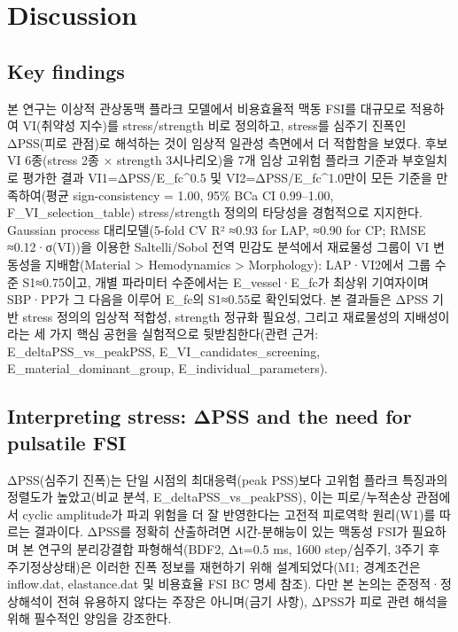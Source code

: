 \documentclass[preprint,12pt]{elsarticle}
\begin{document}
\section{Discussion}

\subsection{Key findings}
본 연구는 이상적 관상동맥 플라크 모델에서 비용효율적 맥동 FSI를 대규모로 적용하여 VI(취약성 지수)를 stress/strength 비로 정의하고, stress를 심주기 진폭인 ΔPSS(피로 관점)로 해석하는 것이 임상적 일관성 측면에서 더 적합함을 보였다. 후보 VI 6종(stress 2종 × strength 3시나리오)을 7개 임상 고위험 플라크 기준과 부호일치로 평가한 결과 VI1=ΔPSS/E\_fc\textasciicircum 0.5 및 VI2=ΔPSS/E\_fc\textasciicircum 1.0만이 모든 기준을 만족하여(평균 sign-consistency = 1.00, 95\% BCa CI 0.99–1.00, F\_VI\_selection\_table) stress/strength 정의의 타당성을 경험적으로 지지한다. Gaussian process 대리모델(5-fold CV R² ≈0.93 for LAP, ≈0.90 for CP; RMSE ≈0.12·σ(VI))을 이용한 Saltelli/Sobol 전역 민감도 분석에서 재료물성 그룹이 VI 변동성을 지배함(Material > Hemodynamics > Morphology): LAP·VI2에서 그룹 수준 S1≈0.75이고, 개별 파라미터 수준에서는 E\_vessel·E\_fc가 최상위 기여자이며 SBP·PP가 그 다음을 이루어 E\_fc의 S1≈0.55로 확인되었다. 본 결과들은 ΔPSS 기반 stress 정의의 임상적 적합성, strength 정규화 필요성, 그리고 재료물성의 지배성이라는 세 가지 핵심 공헌을 실험적으로 뒷받침한다(관련 근거: E\_deltaPSS\_vs\_peakPSS, E\_VI\_candidates\_screening, E\_material\_dominant\_group, E\_individual\_parameters).

\subsection{Interpreting stress: ΔPSS and the need for pulsatile FSI}
ΔPSS(심주기 진폭)는 단일 시점의 최대응력(peak PSS)보다 고위험 플라크 특징과의 정렬도가 높았고(비교 분석, E\_deltaPSS\_vs\_peakPSS), 이는 피로/누적손상 관점에서 cyclic amplitude가 파괴 위험을 더 잘 반영한다는 고전적 피로역학 원리(W1)를 따르는 결과이다. ΔPSS를 정확히 산출하려면 시간-분해능이 있는 맥동성 FSI가 필요하며 본 연구의 분리강결합 파형해석(BDF2, Δt=0.5 ms, 1600 step/심주기, 3주기 후 주기정상상태)은 이러한 진폭 정보를 재현하기 위해 설계되었다(M1; 경계조건은 inflow.dat, elastance.dat 및 비용효율 FSI BC 명세 참조). 다만 본 논의는 준정적·정상해석이 전혀 유용하지 않다는 주장은 아니며(금기 사항), ΔPSS가 피로 관련 해석을 위해 필수적인 양임을 강조한다.
\end{document}
